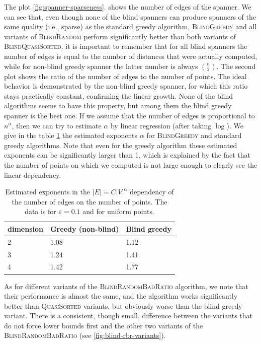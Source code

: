 \documentclass[a4paper,USenglish]{socg-lipics-v2018}
\newcommand{\eps}{\varepsilon}
\begin{document}
The plot \ref{fig:spanner-sparseness}.
shows the number of edges of the spanner.
We can see that, even though none of the blind spanners can produce
spanners of the same quality (i.e., sparse) as the standard greedy algorithm,
\textsc{BlindGreedy} and all variants of \textsc{BlindRandom}
perform significantly better than both variants of \textsc{BlindQuasiSorted}.
it is important to remember that for all blind spanners the number of edges
is equal to the number of distances that were actually computed, while
for non-blind greedy spanner the latter number is always $n \choose 2$.
The second plot shows the ratio of the number of edges to the number of points.
The ideal behavior is demonstrated by the non-blind greedy spanner,
for which this ratio stays practically constant, confirming the linear growth.
None of the blind algorithms seems to have this property, but among them
the blind greedy spanner is the best one. If we assume that the number of edges
is proportional to $n^\alpha$, then we can try to estimate $\alpha$ by 
linear regression (after taking $\log$).  We give in the table \ref{tbl:regr_coeff_spanner}
the estimated exponents $\alpha$ for \textsc{BlindGreedy} and standard
greedy algorithms. Note that even for the greedy algorithm these estimated
exponents can be significantly larger than 1,
which is explained by the fact that the number of points
on which we computed is not large enough to clearly see
the linear dependency.


\begin{table}[]
\label{tbl:regr_coeff_spanner}
\begin{tabular}{|l|l|l|}
\hline
dimension & \textbf{Greedy (non-blind)} & \textbf{Blind greedy} \\ \hline
2         &         1.08                &  1.12                 \\ \hline
3         &         1.24                &  1.41                \\ \hline
4         &         1.42                &  1.77                 \\ \hline
\end{tabular}
\caption{Estimated exponents in the $|E|= C |V|^\alpha$ dependency of the number of edges
on the number of points. The data is for $\eps = 0.1$ and for uniform points.}
\end{table}


As for different variants of the \textsc{BlindRandomBadRatio} algorithm,
we note that their performance is almost the same, and the algorithm works
significantly better than \textsc{QuasiSorted} variants, but obviously
worse than the blind greedy variant. There is a consistent, though small,
difference between the variants that do not force lower bounds first and
the other two variants of the \textsc{BlindRandomBadRatio} (see \ref{fig:blind-rbr-variants}).
\end{document}
